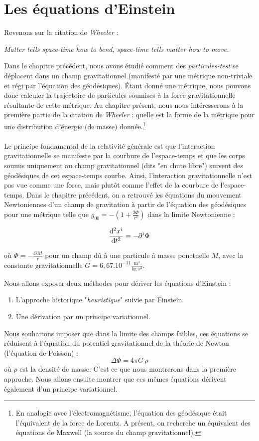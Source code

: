 \chapter{Les équations d'Einstein}
Revenons sur la citation de \emph{Wheeler} :
\begin{center}
    \emph{Matter tells space-time how to bend, space-time tells matter how to move.}
\end{center}
Dans le chapitre précédent, nous avons étudié comment des \emph{particules-test} se déplacent dans un champ gravitationnel (manifesté par une métrique non-triviale et régi par l'équation des géodésiques). Étant donné une métrique, nous pouvons donc calculer la trajectoire de particules soumises à la force gravitationnelle résultante de cette métrique. Au chapitre présent, nous nous intéresserons à la première partie de la citation de \emph{Wheeler} : quelle est la forme de la métrique pour une distribution d'énergie (de masse) donnée.\footnote{En analogie avec l'électromagnétisme, l'équation des géodésique était l'équivalent de la force de Lorentz. A présent, on recherche un équivalent des équations de Maxwell (la source du champ gravitationnel).}\\
\\
Le principe fondamental de la relativité générale est que l'interaction gravitationnelle se manifeste par la courbure de l'espace-temps et que les corps soumis uniquement au champ gravitationnel (dits "en chute libre") suivent des géodésiques de cet espace-temps courbe. Ainsi, l’interaction gravitationnelle n'est pas vue comme une force, mais plutôt comme l'effet de la courbure de l'espace-temps. Dans le chapitre précédent, on a retrouvé les équations du mouvement Newtoniennes d'un champ de gravitation à partir de l'équation des géodésiques pour une métrique telle que $g_{00} = -\left(1 + \frac{2\Phi}{c^2}\right)$ dans la limite Newtonienne :

\begin{equation}
    \frac{\mathrm{d}^2x^{i}}{\mathrm{d} t^2} = -\partial^i \Phi
\end{equation}

où $\Phi = -\frac{GM}{r} $ pour un champ dû à une particule à masse ponctuelle $M$, avec la constante gravitationnelle $G = 6,67.10^{-11} \frac{\text{m}^3}{\text{kg} \text{ s}^2}$. 

Nous allons exposer deux méthodes pour dériver les équations d'Einstein : 
\begin{enumerate}
    \item L'approche historique "\emph{heuristique}" suivie par Einstein.
    \item Une dérivation par un principe variationnel.
\end{enumerate}
Nous souhaitons imposer que dans la limite des champs faibles, ces équations se réduisent à l'équation du potentiel gravitationnel de la théorie de Newton (l'équation de Poisson) :
\begin{equation}
    \Delta \Phi = 4\pi G\,\rho
    \label{eq:Poisson}
\end{equation}
où $\rho$ est la densité de masse. C'est ce que nous montrerons dans la première approche. Nous allons ensuite montrer que ces mêmes équations dérivent également d'un principe variationnel.

